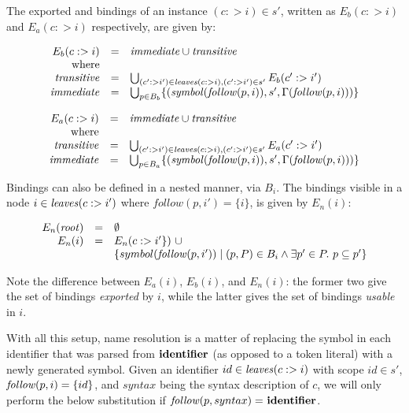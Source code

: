 \documentclass{kththesis}
\begin{document}
The exported  and  bindings of an instance $(c :> i) \in s'$, written as $E_b(c :> i)$ and $E_a(c :> i)$ respectively, are given by:

$$
\begin{array}{rcl}
E_b(c :> i) & = & \mathit{immediate} \cup \mathit{transitive} \\
\text{where} & & \\
\mathit{transitive} & = & \bigcup_{(c' :> i') \in \mathit{leaves}(c :> i), (c' :> i') \in s'} E_b(c' :> i') \\
\mathit{immediate} & = & \bigcup_{p \in B_b} \{(\mathit{symbol}(\mathit{follow}(p, i)), s', \Gamma(\mathit{follow}(p, i)))\}
\end{array}
$$

$$
\begin{array}{rcl}
E_a(c :> i) & = & \mathit{immediate} \cup \mathit{transitive} \\
\text{where} & & \\
\mathit{transitive} & = & \bigcup_{(c' :> i') \in \mathit{leaves}(c :> i), (c' :> i') \in s'} E_a(c' :> i') \\
\mathit{immediate} & = & \bigcup_{p \in B_a} \{(\mathit{symbol}(\mathit{follow}(p, i)), s', \Gamma(\mathit{follow}(p, i)))\}
\end{array}
$$

Bindings can also be defined in a nested manner, via $B_i$. The bindings visible in a node $i \in \mathit{leaves}(c :> i')$ where $follow(p, i') = \{i\}$, is given by $E_n(i)$:

$$
\begin{array}{rcl}
E_n(\mathit{root}) & = & \emptyset \\
E_n(i) & = & E_n(c :> i'\})\ \cup \\
& & \{ symbol(\mathit{follow}(p, i')) \mid (p, P) \in B_i \land \exists p' \in P.\ p \subseteq p'\} \\
\end{array}
$$

Note the difference between $E_a(i)$, $E_b(i)$, and $E_n(i)$: the former two give the set of bindings \emph{exported} by $i$, while the latter gives the set of bindings \emph{usable} in $i$.


With all this setup, name resolution is a matter of replacing the symbol in each identifier that was parsed from $\mathrel{\mathbf{identifier}}$ (as opposed to a token literal) with a newly generated symbol. Given an identifier $id \in \mathit{leaves}(c :> i)$ with scope $id \in s'$, $\mathit{follow}(p, i) = \{id\}$, and $syntax$ being the syntax description of $c$, we will only perform the below substitution if $\mathit{follow}(p, syntax) =\ \mathrel{\mathbf{identifier}}$.
\end{document}
